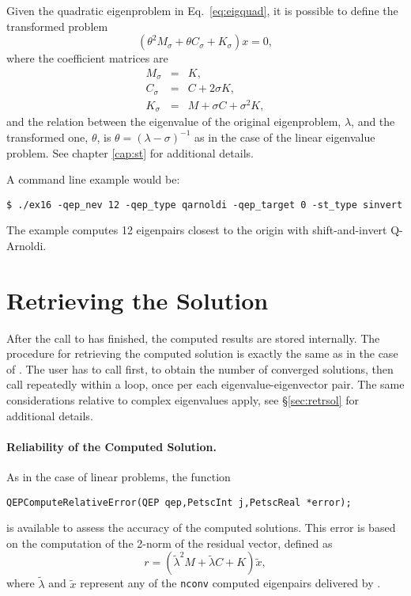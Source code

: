 Given the quadratic eigenproblem in Eq.\ \ref{eq:eigquad}, it is possible to define the transformed problem
\begin{equation}
(\theta^2M_\sigma+\theta C_\sigma+K_\sigma)x=0,\label{eq:sinvquad}
\end{equation}
where the coefficient matrices are
\begin{eqnarray}
M_\sigma&\!\!=\!\!&K,\\
C_\sigma&\!\!=\!\!&C+2\sigma K,\\
K_\sigma&\!\!=\!\!&M+\sigma C+\sigma^2 K,
\end{eqnarray}
and the relation between the eigenvalue of the original eigenproblem, $\lambda$, and the transformed one, $\theta$, is $\theta=(\lambda-\sigma)^{-1}$ as in the case of the linear eigenvalue problem. See chapter \ref{cap:st} for additional details.

A command line example would be:
	\begin{Verbatim}[fontsize=\small]
	$ ./ex16 -qep_nev 12 -qep_type qarnoldi -qep_target 0 -st_type sinvert
	\end{Verbatim}
The example computes 12 eigenpairs closest to the origin with shift-and-invert Q-Arnoldi.

\section{Retrieving the Solution}

After the call to  has finished, the computed results are stored internally. The procedure for retrieving the computed solution is exactly the same as in the case of . The user has to call  first, to obtain the number of converged solutions, then call  repeatedly within a loop, once per each eigenvalue-eigenvector pair. The same considerations relative to complex eigenvalues apply, see \S\ref{sec:retrsol} for additional details.

\paragraph{Reliability of the Computed Solution.}

As in the case of linear problems, the function
	\begin{Verbatim}[fontsize=\small]
	QEPComputeRelativeError(QEP qep,PetscInt j,PetscReal *error);
	\end{Verbatim}
is available to assess the accuracy of the computed solutions. This error is based on the computation of the 2-norm of the residual vector, defined as
\begin{equation}
r=(\tilde{\lambda}^2M+\tilde{\lambda} C+K)\tilde{x},\label{eq:resquad}
\end{equation}
where $\tilde{\lambda}$ and $\tilde{x}$ represent any of the \texttt{nconv} computed eigenpairs delivered by .

